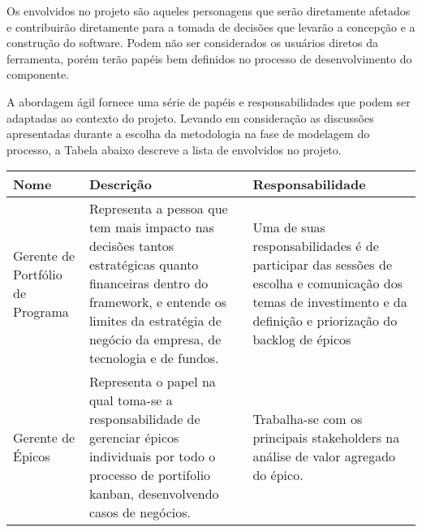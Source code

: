   Os envolvidos no projeto são aqueles personagens que serão diretamente afetados e contribuirão diretamente para a tomada de decisões que
  levarão a concepção e a construção do software. Podem não ser considerados os usuários diretos da ferramenta, porém terão papéis bem definidos
  no processo de desenvolvimento do componente.

  A abordagem ágil fornece uma série de papéis e responsabilidades que podem ser adaptadas ao contexto do projeto. Levando em consideração as
  discussões apresentadas durante a escolha da metodologia na fase de modelagem do processo, a Tabela abaixo descreve a lista de envolvidos no
  projeto.

  \begin{table}[!htb]
    \centering
    \begin{tabular}{p{}p{6cm}p{6cm}} \hline
      \rowcolor{gray!50}
        \textbf{Nome}                    & \textbf{Descrição}                               & \textbf{Responsabilidade}                     \\
      \hline
        Gerente de Portfólio de Programa & Representa a pessoa que tem mais impacto
                                           nas decisões tantos estratégicas quanto
                                           financeiras dentro do framework, e entende
                                           os limites da estratégia de negócio da empresa,
                                           de tecnologia e de fundos.                       & Uma de suas responsabilidades é de
                                                                                              participar das sessões de escolha e
                                                                                              comunicação dos temas de investimento
                                                                                              e da definição e priorização do backlog
                                                                                              de épicos                                     \\
        Gerente de Épicos                & Representa o papel na qual toma-se a
                                           responsabilidade de gerenciar épicos individuais
                                           por todo o processo de portifolio kanban,
                                           desenvolvendo casos de negócios.                 & Trabalha-se com os principais stakeholders
                                                                                              na análise de valor agregado do épico.

\end{tabular}
\end{table}
